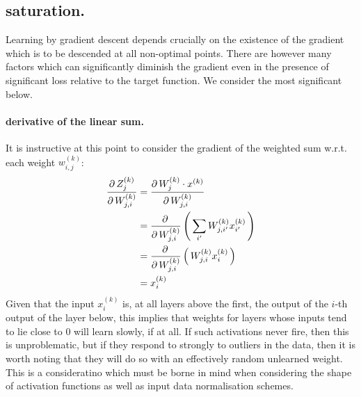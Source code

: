 \documentclass[msc]{infthesis}
\newcommand{\weightedsum}[2][]{Z_{#1}^{(#2)}}
\newcommand{\weight}[2]{w_{#1}^{(#2)}}
\newcommand{\weights}[2][]{W_{#1}^{(#2)}}
\newcommand{\activation}[2][]{x_{#1}^{(#2)}}
\newcommand{\of}[1]{\left(\,{#1}\,\right)}
\begin{document}
\subsection{saturation.}
\label{sec:classification:learning:saturation}

Learning by gradient descent depends crucially on the existence of the gradient which is to be
descended at all non-optimal points.  There are however many factors which can significantly
diminish the gradient even in the presence of significant loss relative to the target function.
We consider the most significant below.


\paragraph*{derivative of the linear sum.}
\label{sec:classification:2-2-1}
It is instructive at this point to consider the gradient of the weighted sum w.r.t. each weight
\(\weight{i,j}{k}\):
\begin{align}
  \derivative[{ \weightedsum[j]{k} }]{ \weights[j,i]{k} }
  &=
  \derivative[{ \weights[j]{k} \cdot \activation{k} }]{ \weights[j,i]{k} }
  \\
  &=
  \derivative{\weights[j,i]{k}} \of{ \sum_{i'} \weights[j,i']{k} \activation[i']{k} } 
  \\
  &=
  \derivative{ \weights[j,i]{k} } \of{  \weights[j,i]{k} \activation[i]{k} }
  \\
  &=
  \activation[i]{k}
\end{align}
%
Given that the input \(\activation[i]{k}\) is, at all layers above the first, the output of the
\(i\)-th output of the layer below, this implies that weights for layers whose inputs tend to
lie close to 0 will learn slowly, if at all.  If such activations never fire, then this is
unproblematic, but if they respond to strongly to outliers in the data, then it is worth noting
that they will do so with an effectively random unlearned weight.  This is a consideratino which
must be borne in mind when considering the shape of activation functions as well as input data
normalisation schemes.
\end{document}
